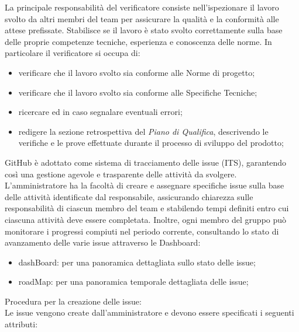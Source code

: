 La principale responsabilità del verificatore consiste nell’ispezionare il lavoro svolto da altri membri del team per assicurare la qualità e la conformità alle attese prefissate. Stabilisce se il lavoro è stato svolto correttamente sulla base delle proprie competenze tecniche, esperienza e conoscenza delle norme.
In particolare il verificatore si occupa di:
\begin{itemize}
    \item verificare che il lavoro svolto sia conforme alle Norme di progetto;
    \item verificare che il lavoro svolto sia conforme alle Specifiche Tecniche;
    \item ricercare ed in caso segnalare eventuali errori;
    \item redigere la sezione retrospettiva del \textit{Piano di Qualifica}, descrivendo le verifiche e le prove effettuate durante il processo di sviluppo del prodotto;
\end{itemize}
GitHub è adottato come sistema di tracciamento delle issue (ITS), garantendo così una gestione agevole e trasparente delle attività da svolgere.
L’amministratore ha la facoltà di creare e assegnare specifiche issue sulla base delle attività identificate dal responsabile, assicurando chiarezza sulle responsabilità di ciascun membro del team e stabilendo tempi definiti entro cui ciascuna attività deve essere completata. Inoltre, ogni membro del gruppo può monitorare i progressi compiuti nel periodo corrente, consultando lo stato di avanzamento delle varie issue attraverso le Dashboard:
\begin{itemize}
    \item dashBoard: per una panoramica dettagliata sullo stato delle issue;
    \item roadMap: per una panoramica temporale dettagliata delle issue;
\end{itemize}
Procedura per la creazione delle issue:\\
Le issue vengono create dall’amministratore e devono essere specificati i seguenti attributi:
